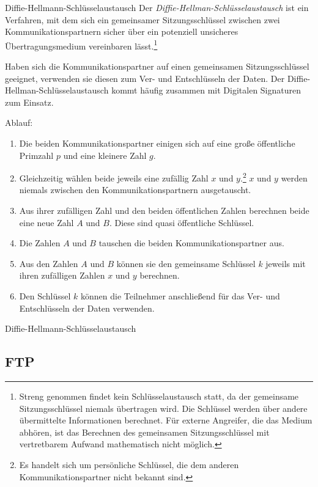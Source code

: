\begin{defi}{Diffie-Hellmann-Schlüsselaustausch}
    Der \emph{Diffie-Hellman-Schlüsselaustausch} ist ein Verfahren, mit dem sich ein gemeinsamer Sitzungsschlüssel zwischen zwei Kommunikationspartnern sicher über ein potenziell unsicheres Übertragungsmedium vereinbaren lässt.\footnote{Streng genommen findet kein Schlüsselaustausch statt, da der gemeinsame Sitzungsschlüssel niemals übertragen wird. Die Schlüssel werden über andere übermittelte Informationen berechnet. Für externe Angreifer, die das Medium abhören, ist das Berechnen des gemeinsamen Sitzungsschlüssel mit vertretbarem Aufwand mathematisch nicht möglich.}

    Haben sich die Kommunikationspartner auf einen gemeinsamen Sitzungsschlüssel geeignet, verwenden sie diesen zum Ver- und Entschlüsseln der Daten. Der Diffie-Hellman-Schlüsselaustausch kommt häufig zusammen mit Digitalen Signaturen zum Einsatz.

    Ablauf:
    \begin{enumerate}
        \item Die beiden Kommunikationspartner einigen sich auf eine große öffentliche Primzahl $p$ und eine kleinere Zahl $g$.
        \item Gleichzeitig wählen beide jeweils eine zufällig Zahl $x$ und $y$.\footnote{Es handelt sich um persönliche Schlüssel, die dem anderen Kommunikationspartner nicht bekannt sind.} $x$ und $y$ werden niemals zwischen den Kommunikationspartnern ausgetauscht.
        \item Aus ihrer zufälligen Zahl und den beiden öffentlichen Zahlen berechnen beide eine neue Zahl $A$ und $B$. Diese sind quasi öffentliche Schlüssel.
        \item Die Zahlen $A$ und $B$ tauschen die beiden Kommunikationspartner aus.
        \item Aus den Zahlen $A$ und $B$ können sie den gemeinsame Schlüssel $k$ jeweils mit ihren zufälligen Zahlen $x$ und $y$ berechnen.
        \item Den Schlüssel $k$ können die Teilnehmer anschließend für das Ver- und Entschlüsseln der Daten verwenden.
    \end{enumerate}
\end{defi}

\begin{example}{Diffie-Hellmann-Schlüsselaustausch}

\end{example}

\subsection{FTP}

